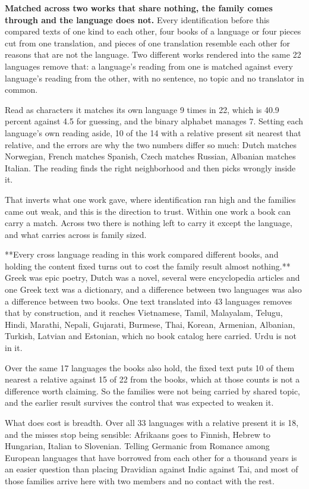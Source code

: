 \textbf{Matched across two works that share nothing, the family comes through and the language does not.} Every identification before this compared texts of one kind to each other, four books of a language or four pieces cut from one translation, and pieces of one translation resemble each other for reasons that are not the language. Two different works rendered into the same 22 languages remove that: a language's reading from one is matched against every language's reading from the other, with no sentence, no topic and no translator in common.

Read as characters it matches its own language 9 times in 22, which is 40.9 percent against 4.5 for guessing, and the binary alphabet manages 7. Setting each language's own reading aside, 10 of the 14 with a relative present sit nearest that relative, and the errors are why the two numbers differ so much: Dutch matches Norwegian, French matches Spanish, Czech matches Russian, Albanian matches Italian. The reading finds the right neighborhood and then picks wrongly inside it.

That inverts what one work gave, where identification ran high and the families came out weak, and this is the direction to trust. Within one work a book can carry a match. Across two there is nothing left to carry it except the language, and what carries across is family sized.

**Every cross language reading in this work compared different books, and holding the content fixed turns out to cost the family result almost nothing.** Greek was epic poetry, Dutch was a novel, several were encyclopedia articles and one Greek text was a dictionary, and a difference between two languages was also a difference between two books. One text translated into 43 languages removes that by construction, and it reaches Vietnamese, Tamil, Malayalam, Telugu, Hindi, Marathi, Nepali, Gujarati, Burmese, Thai, Korean, Armenian, Albanian, Turkish, Latvian and Estonian, which no book catalog here carried. Urdu is not in it.

Over the same 17 languages the books also hold, the fixed text puts 10 of them nearest a relative against 15 of 22 from the books, which at those counts is not a difference worth claiming. So the families were not being carried by shared topic, and the earlier result survives the control that was expected to weaken it.

What does cost is breadth. Over all 33 languages with a relative present it is 18, and the misses stop being sensible: Afrikaans goes to Finnish, Hebrew to Hungarian, Italian to Slovenian. Telling Germanic from Romance among European languages that have borrowed from each other for a thousand years is an easier question than placing Dravidian against Indic against Tai, and most of those families arrive here with two members and no contact with the rest.

